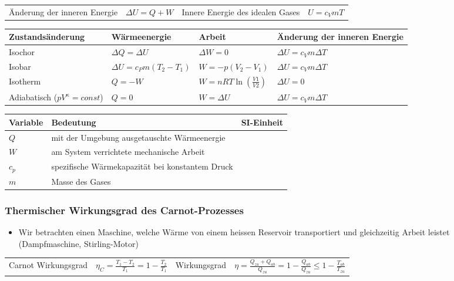 \documentclass[
a4paper,
oneside,
landscape, 
8pt,
]{scrartcl}
\begin{document}
\begin{multicols*}{2}
\begin{tabbing}
	\begin{tabu} to \linewidth {X l X l}
		\toprule
		Änderung der inneren Energie & $\Delta U = Q + W$  &
		Innere Energie des idealen Gases & $U = c_VmT$  \\
	\end{tabu}
\end{tabbing}

\begin{tabbing}
	\begin{tabu} to \linewidth {X l l l}
		\toprule
		Zustandsänderung & Wärmeenergie & Arbeit & Änderung der inneren Energie \\
		\midrule 
		Isochor & $\Delta Q = \Delta U$ & $\Delta W = 0$ & $\Delta U = c_V m \Delta T$ \\ 
		Isobar & $\Delta U = c_P m (T_2 - T_1)$ & $W = -p (V_2 - V_1)$ & $\Delta U = c_V m \Delta T$  \\
		Isotherm & $Q = -W$ & $ W = nRT \ln(\frac{V1}{V2}) $ & $\Delta U = 0$ \\
		Adiabatisch \hfill ($p V^\kappa = const$) & $Q = 0$ & $W = \Delta U$ & $\Delta U = c_V m \Delta T$ \\ 
	\end{tabu}
\end{tabbing}

\begin{tabbing}
	\begin{tabu} to \linewidth {l X l}
		Variable & Bedeutung & SI-Einheit \\
		\midrule
		$Q$ & mit der Umgebung ausgetauschte Wärmeenergie &  \\
		$W$ & am System verrichtete mechanische Arbeit &  \\
		$c_p$ & spezifische Wärmekapazität bei konstantem Druck &  \\
		$m$ & Masse des Gases &  \\
		\bottomrule
	\end{tabu}
\end{tabbing}

\subsubsection{Thermischer Wirkungsgrad des Carnot-Prozesses}
\begin{itemize}
	\item Wir betrachten einen Maschine, welche Wärme von einem heissen Reservoir transportiert und gleichzeitig Arbeit leistet (Dampfmaschine, Stirling-Motor)
\end{itemize}
\begin{tabbing}
	\begin{tabu} to \linewidth {X l X l}
		\toprule
		Carnot Wirkungsgrad & $\eta_C = \frac{T_1 - T_2}{T_1} = 1 - \frac{T_2}{T_1}$  & 
		Wirkungsgrad & $\eta = \frac{Q_{zu} + Q_{ab}}{Q_{zu}} = 1- \frac{Q_{ab}}{Q_{zu}} \leq 1 - \frac{T_{ab}}{T_{zu}}$  \\
	\end{tabu}
\end{tabbing}


\end{multicols*}
\end{document}
